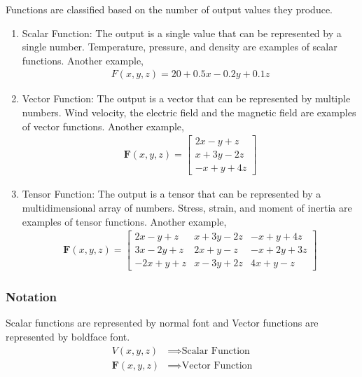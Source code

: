 Functions are classified based on the number of output values they produce.
\begin{enumerate}
  \item Scalar Function: The output is a single value that can be
    represented by a single number. Temperature, pressure, and density
    are examples of scalar functions. Another example,
    \begin{align*}
      F(x, y, z) = 20 + 0.5x - 0.2y + 0.1z
    \end{align*}
  \item Vector Function: The output is a vector that can be represented
    by multiple numbers. Wind velocity, the electric field and the magnetic
    field are examples of vector functions. Another example,
    \begin{align*}
      \mathbf{F}(x, y, z) = \begin{bmatrix}
      2x - y + z \\
      x + 3y - 2z \\
      -x + y + 4z
      \end{bmatrix}
    \end{align*}
  \item Tensor Function: The output is a tensor that can be represented
    by a multidimensional array of numbers. Stress, strain, and moment
    of inertia are examples of tensor functions. Another example,
    \begin{align*}
      \mathbf{F}(x, y, z) = \begin{bmatrix}
      2x - y + z & x + 3y - 2z & -x + y + 4z \\
      3x - 2y + z & 2x + y - z & -x + 2y + 3z \\
      -2x + y + z & x - 3y + 2z & 4x + y - z
      \end{bmatrix}
    \end{align*}
\end{enumerate}

\subsubsection{Notation}

Scalar functions are represented by normal font and Vector functions are
represented by boldface font.
\begin{align*}
  V(x, y, z) &\implies \text{Scalar Function} \\
  \mathbf{F}(x, y, z) &\implies \text{Vector Function}
\end{align*}

